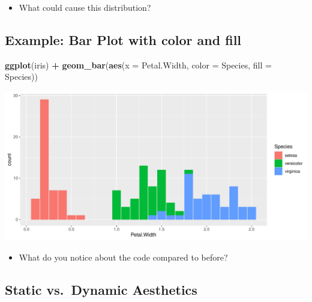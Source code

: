 \documentclass[
]{book}
\newenvironment{Shaded}{\begin{snugshade}}{\end{snugshade}}
\newcommand{\AttributeTok}[1]{\textcolor[rgb]{0.13,0.29,0.53}{#1}}
\newcommand{\FunctionTok}[1]{\textcolor[rgb]{0.13,0.29,0.53}{\textbf{#1}}}
\newcommand{\NormalTok}[1]{#1}
\newcommand{\SpecialCharTok}[1]{\textcolor[rgb]{0.81,0.36,0.00}{\textbf{#1}}}
\providecommand{\tightlist}{%
  \setlength{\itemsep}{0pt}\setlength{\parskip}{0pt}}
\begin{document}
\begin{itemize}
\tightlist
\item
  What could cause this distribution?
\end{itemize}

\subsection{Example: Bar Plot with color and fill}\label{example-bar-plot-with-color-and-fill-1}

\begin{Shaded}
\begin{Highlighting}[]
\FunctionTok{ggplot}\NormalTok{(iris) }\SpecialCharTok{+} 
  \FunctionTok{geom\_bar}\NormalTok{(}\FunctionTok{aes}\NormalTok{(}\AttributeTok{x =}\NormalTok{ Petal.Width, }\AttributeTok{color =}\NormalTok{ Species, }\AttributeTok{fill =}\NormalTok{ Species))}
\end{Highlighting}
\end{Shaded}

\begin{flushleft}\includegraphics{_main_files/figure-latex/unnamed-chunk-50-1} \end{flushleft}

\begin{itemize}
\tightlist
\item
  What do you notice about the code compared to before?
\end{itemize}

\subsection{Static vs.~Dynamic Aesthetics}\label{static-vs.-dynamic-aesthetics}
\end{document}
